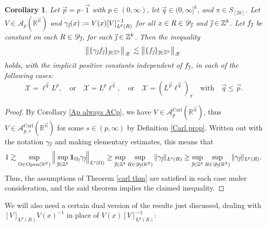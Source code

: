 \documentclass[11pt, reqno]{amsart}
\newtheorem{corollary}[theorem]{Corollary}
\theoremstyle{definition}
\theoremstyle{remark}
\numberwithin{equation}{section}
\newcommand{\A}{\mathscr A}
\newcommand{\D}{\mathscr D}
\newcommand{\R}{\mathbb R}
\newcommand{\Xs}{\mathscr X}
\newcommand{\Z}{\mathbb Z}
\newcommand{\vone}{\vec 1}
\newcommand{\vj}{\vec{\textit{\j}}}
\newcommand{\vn}{\vec n}
\newcommand{\vp}{\vec p}
\newcommand{\vq}{\vec q}
\newcommand{\one}{\mathbf{1}}
\newcommand{\aveL}{\textit{\L}}
\newcommand{\Norm}[2]{\|#1\|_{#2}}
\newcommand{\bNorm}[2]{\big\|#1\big\|_{#2}}
\newcommand{\Carl}{\mathrm{Carl}}
\newcommand{\Open}{\mathrm{Open}}
\newcommand{\AC}{\A^{\Carl}}
\begin{document}
\begin{corollary}\label{Carl Ap}
Let $\vp=p\cdot\vone$ with $p\in(0,\infty)$, let $\vq\in(0,\infty]^k$, and $\pi\in S_{[2k]}$.
Let $V\in\A_p(\R^{\vn})$ and $\gamma_{\vj}(x):=V(x)[V]_{\aveL^p(R)}^{-1}$ for all $x\in R\in\D_{\vj}$ and $\vj\in\Z^k$.
Let $f_{\vj}$ be constant on each $R\in\D_{\vj}$, for each $\vj\in\Z^k$.
Then the inequality
\begin{equation*}
\bNorm{\{\gamma_{\vj}f_{\vj}\}_{\vj\in\Z^k}}{\Xs}
\lesssim\bNorm{\{ f_{\vj}\}_{\vj\in\Z^k}}{\Xs}
\end{equation*}
holds, with the implicit positive constants independent of $f_{\vj}$, in each of the following cases:
\begin{equation*}
\Xs =\ell^{\vq}L^p,\quad\text{or}\quad
\Xs = L^p\ell^{\vq},\quad\text{or}\quad
\Xs = (L^{\vp}\ell^{\vq})_\pi\quad\text{with}\quad \vq\leq\vp.
\end{equation*}
\end{corollary}

\begin{proof}
By Corollary \ref{Ap always ACp}, we have $V\in\AC_p(\R^{\vn})$, thus $V\in\AC_{p,s}(\R^{\vn})$ for some $s\in(p,\infty)$ by Definition \ref{Carl prop}. Written out with the notation $\gamma_{\vj}$ and making elementary estimates, this means that
\begin{equation*}
1
\gtrsim\sup_{\Omega\in\Open(\R^{\vn})}
\Big\|\sup_{\vj\in\mathbb Z^k} \one_{\Omega_{\vj}} \gamma_{\vj}\Big\|_{\aveL^s(\Omega)}
\geq\sup_{\vj\in\mathbb Z^k}\sup_{R\in\D_{\vj}(\R^{\vn})}
\Norm{\gamma_{\vj}}{\aveL^s(R)}
\geq\sup_{\vj\in\mathbb Z^k}\sup_{R\in\D_{\vj}(\R^{\vn})}
\Norm{\gamma_{\vj}}{\aveL^p(R)}.
\end{equation*}
Thus, the assumptions of Theorem \ref{carl thm} are satisfied in each case under consideration, and the said theorem implies the claimed inequality.
\end{proof}

We will also need a certain dual version of the results just discussed, dealing with $[V]_{\aveL^p(R)}V(x)^{-1}$ in place of $V(x)[V]_{\aveL^p(R)}^{-1}$:
\end{document}
